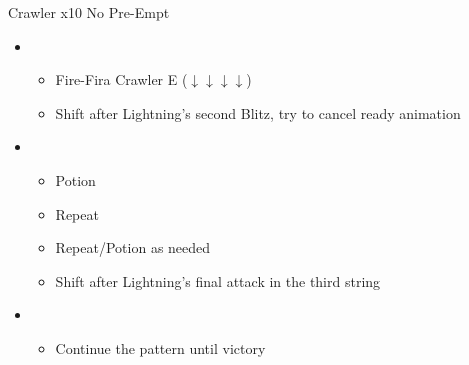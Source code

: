 	\begin{battle}[0:17]{Crawler x10 No Pre-Empt}
		\begin{itemize}
			\item \first
			      \begin{itemize}
				      \item Fire-Fira Crawler E ($\downarrow \downarrow \downarrow \downarrow$)
				      \item Shift after Lightning's second Blitz, try to cancel ready animation
			      \end{itemize}
			\item \sixth
			      \begin{itemize}
				      \item Potion
				      \item Repeat
				      \item Repeat/Potion as needed
				      \item Shift after Lightning's final attack in the third string
			      \end{itemize}
			\item \first
			      \begin{itemize}
				      \item Continue the pattern until victory
			      \end{itemize}
		\end{itemize}
	\end{battle}
	\renewcommand{\first}{[1] Slash \& Burn (\com/\rav)}
	\renewcommand{\second}{[2] War \& Peace (\com/\med)}
	\renewcommand{\third}{[3] Supersoldier (\com/\syn)}
	\renewcommand{\fourth}{[4] Dualcasting (\rav/\rav)}
	\renewcommand{\fifth}{[5] Dualcasting (\rav/\rav)}
	\renewcommand{\sixth}{[6] Slash \& Burn (\com/\rav)}
